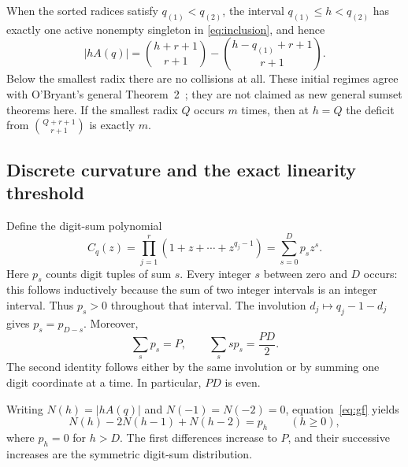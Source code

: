 \documentclass[11pt]{article}
\numberwithin{equation}{section}
\theoremstyle{definition}
\theoremstyle{remark}\newtheorem{remark}[theorem]{Remark}
\begin{document}
When the sorted radices satisfy $q_{(1)}<q_{(2)}$, the interval
$q_{(1)}\le h<q_{(2)}$ has exactly one active nonempty singleton in
\eqref{eq:inclusion}, and hence
\[
 |hA(q)|=\binom{h+r+1}{r+1}
          -\binom{h-q_{(1)}+r+1}{r+1}.
\]
Below the smallest radix there are no collisions at all.  These initial
regimes agree with O'Bryant's general Theorem~2~\cite{obryant}; they are
not claimed as new general sumset theorems here.  If the smallest radix
$Q$ occurs $m$ times, then at $h=Q$ the deficit from
$\binom{Q+r+1}{r+1}$ is exactly $m$.

\subsection{Discrete curvature and the exact linearity threshold}

Define the digit-sum polynomial
\begin{equation}\label{eq:digitpoly}
 C_q(z)=\prod_{j=1}^r(1+z+\cdots+z^{q_j-1})
       =\sum_{s=0}^D p_s z^s.
\end{equation}
Here $p_s$ counts digit tuples of sum $s$.  Every integer $s$ between zero
and $D$ occurs: this follows inductively because the sum of two integer
intervals is an integer interval.  Thus $p_s>0$ throughout that interval.
The involution $d_j\mapsto q_j-1-d_j$ gives $p_s=p_{D-s}$.
Moreover,
\begin{equation}\label{eq:digitmoments}
 \sum_s p_s=P,\qquad \sum_s s p_s=\frac{PD}{2}.
\end{equation}
The second identity follows either by the same involution or by summing
one digit coordinate at a time.  In particular, $PD$ is even.

Writing $N(h)=|hA(q)|$ and $N(-1)=N(-2)=0$, equation~\eqref{eq:gf} yields
\begin{equation}\label{eq:curvature}
 N(h)-2N(h-1)+N(h-2)=p_h\qquad(h\ge0),
\end{equation}
where $p_h=0$ for $h>D$.  The first differences increase to $P$, and their
successive increases are the symmetric digit-sum distribution.
\end{document}
